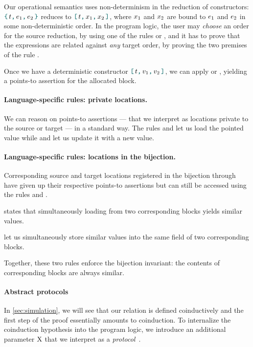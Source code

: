 Our operational semantics uses non-determinism in the reduction of constructors: $\datalangBlock{\datalangTag}{\datalangExpr_1}{\datalangExpr_2}$ reduces to $\datalangBlockDet{\datalangTag}{\datalangVar_1}{\datalangVar_2}$, where $\datalangVar_1$ and $\datalangVar_2$ are bound to $\datalangExpr_1$ and $\datalangExpr_2$ in some non-deterministic order.
In the program logic, the user may \emph{choose} an order for the source reduction, by using one of the rules  or , and it has to prove that the expressions are related against \emph{any} target order, by proving the two premises of the rule .

Once we have a deterministic constructor $\datalangBlockDet{\datalangTag}{\datalangVal_1}{\datalangVal_2}$, we can apply  or , yielding a points-to assertion for the allocated block.

\paragraph{Language-specific rules: private locations.}
We can reason on points-to assertions --- that we interpret as locations private to the source or target --- in a standard way.
The rules  and  let us load the pointed value while  and  let us update it with a new value.

\paragraph{Language-specific rules: locations in the bijection.}
Corresponding source and target locations registered in the bijection through  have given up their respective points-to assertions but can still be accessed using the rules  and .

 states that simultaneously loading from two corresponding blocks yields similar values.

 let us simultaneously store similar values into the same field of two corresponding blocks.

Together, these two rules enforce the bijection invariant: the contents of corresponding blocks are always similar.

\paragraph{Abstract protocols}
In \cref{sec:simulation}, we will see that our relation is defined coinductively and the first step of the proof essentially amounts to coinduction.
To internalize the coinduction hypothesis into the program logic, we introduce an additional parameter $\mathrm{X}$ that we interpret as a \emph{protocol}~\cite{DBLP:journals/pacmpl/VilhenaP21}.


